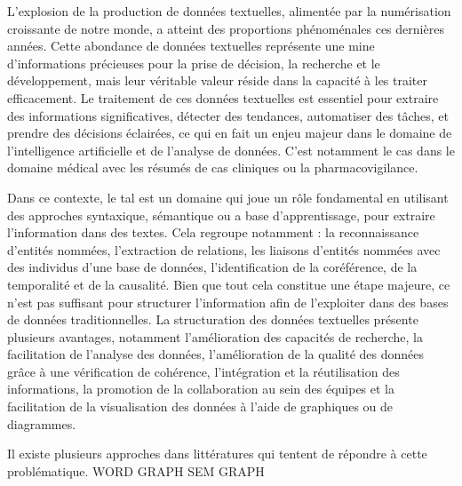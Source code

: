 L'explosion de la production de données textuelles, alimentée par la numérisation croissante de notre monde, a atteint des proportions phénoménales ces dernières années.
Cette abondance de données textuelles représente une mine d'informations précieuses pour la prise de décision, la recherche et le développement, mais leur véritable valeur réside dans la capacité à les traiter efficacement.
Le traitement de ces données textuelles est essentiel pour extraire des informations significatives, détecter des tendances, automatiser des tâches, et prendre des décisions éclairées, ce qui en fait un enjeu majeur dans le domaine de l'intelligence artificielle et de l'analyse de données.
C'est notamment le cas dans le domaine médical avec les résumés de cas cliniques ou la pharmacovigilance.

Dans ce contexte, le \gls{tal} est un domaine qui joue un rôle fondamental en utilisant des approches syntaxique, sémantique ou a base d'apprentissage, pour extraire l'information dans des textes.
Cela regroupe notamment : la reconnaissance d'entités nommées, l'extraction de relations, les liaisons d'entités nommées avec des individus d'une base de données, l'identification de la coréférence, de la temporalité et de la causalité.
Bien que tout cela constitue une étape majeure, ce n'est pas suffisant pour structurer l'information afin de l'exploiter dans des bases de données traditionnelles.
La structuration des données textuelles présente plusieurs avantages, notamment l'amélioration des capacités de recherche, la facilitation de l'analyse des données, l'amélioration de la qualité des données grâce à une vérification de cohérence, l'intégration et la réutilisation des informations, la promotion de la collaboration au sein des équipes et la facilitation de la visualisation des données à l'aide de graphiques ou de diagrammes.

Il existe plusieurs approches dans littératures qui tentent de répondre à cette problématique.
WORD GRAPH
SEM GRAPH
